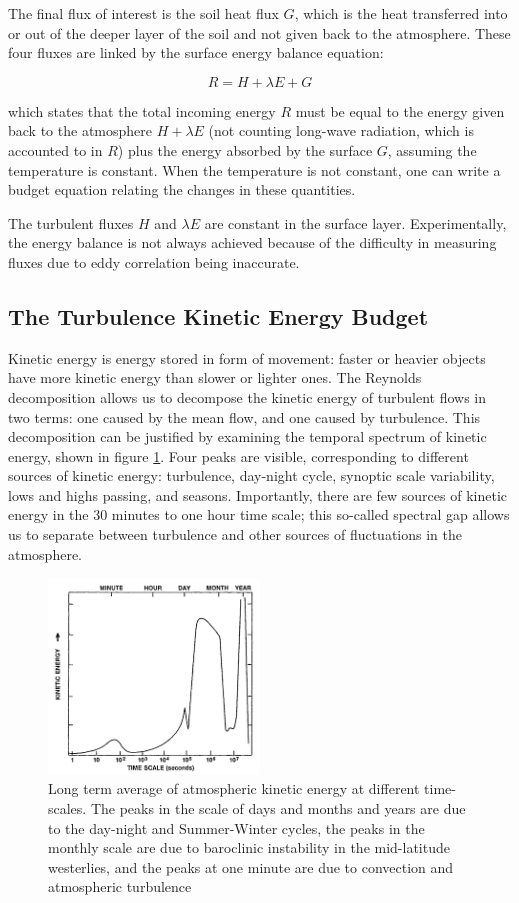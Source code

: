 \documentclass[12pt]{book}
\begin{document}
The final flux of interest is the soil heat flux $G$, which is the heat transferred into or out of the deeper layer of the soil and not given back to the atmosphere. These four fluxes are linked by the surface energy balance equation:

$$
R=H+\lambda E+G
$$

which states that the total incoming energy $R$ must be equal to the energy given back to the atmosphere $H+\lambda E$ (not counting long-wave radiation, which is accounted to in $R$) plus the energy absorbed by the surface $G$, assuming the temperature is constant. When the temperature is not constant, one can write a budget equation relating the changes in these quantities.

The turbulent fluxes $H$ and $\lambda E$ are constant in the surface layer. Experimentally, the energy balance is not always achieved \citep{cabauwinsitu} because of the difficulty in measuring fluxes due to eddy correlation being inaccurate.

\subsection{The Turbulence Kinetic Energy Budget}
Kinetic energy is energy stored in form of movement: faster or heavier objects have more kinetic energy than slower or lighter ones. The Reynolds decomposition allows us to decompose the kinetic energy of turbulent flows in two terms: one caused by the mean flow, and one caused by turbulence. This decomposition can be justified by examining the temporal spectrum of kinetic energy, shown in figure \ref{fig:tkespectrum}. Four peaks are visible, corresponding to different sources of kinetic energy: turbulence, day-night cycle, synoptic scale variability, lows and highs passing, and seasons. Importantly, there are few sources of kinetic energy in the 30 minutes to one hour time scale; this so-called spectral gap allows us to separate between turbulence and other sources of fluctuations in the atmosphere.

\begin{figure}
\caption{Long term average of atmospheric kinetic energy at different time-scales. The peaks in the scale of days and months and years are due to the day-night and Summer-Winter cycles, the peaks in the monthly scale are due to baroclinic instability in the mid-latitude westerlies, and the peaks at one minute are due to convection and atmospheric turbulence \citep{tkespectrumsrc,tkespectrumorig}}
\label{fig:tkespectrum}
\centering
\includegraphics[width=0.5\textwidth]{images/kinetic_energy_spectrum}
\end{figure}
\end{document}
